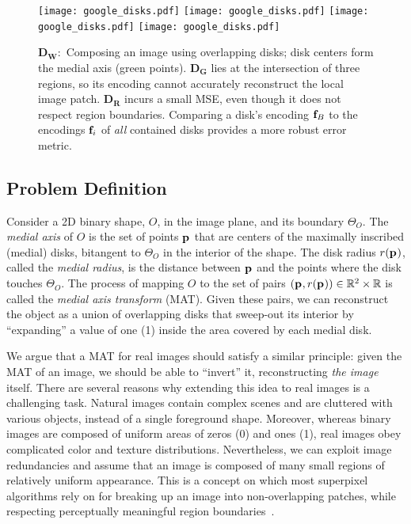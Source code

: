 \documentclass[10pt,twocolumn,letterpaper]{article}
\begin{document}
\begin{figure*}[t]
\centering
\def\imgw{0.245}
\texttt{[image: google\_disks.pdf]}
\texttt{[image: google\_disks.pdf]}
\texttt{[image: google\_disks.pdf]}
\texttt{[image: google\_disks.pdf]}
\caption{$\mathbf{D_W:}$ Composing an image using overlapping disks; disk centers form the medial axis (green points).
$\mathbf{D_G}$ lies at the intersection of three regions, so its encoding cannot accurately reconstruct the local image patch.
$\mathbf{D_R}$ incurs a small MSE, even though it does not respect region boundaries.
Comparing a disk's encoding $\mathbf{f}_{B}$ to the encodings $\mathbf{f}_{i}$ of \emph{all} contained disks provides a more robust
error metric.}
\label{fig:google}
\end{figure*}

\subsection{Problem Definition}\label{sec:method:definition}
Consider a 2D binary shape, $O$, in the image plane, and its boundary $\Theta_O$.
The \emph{medial axis} of $O$ is the set of points $\mathbf{p}_{}$ that
are centers of the maximally inscribed (medial) disks, bitangent to $\Theta_O$
in the interior of the shape. The disk radius $r(\mathbf{p}_{})$, called the \emph{medial radius}, 
is the distance between $\mathbf{p}_{}$ and the points where the disk touches $\Theta_O$.
The process of mapping $O$ to the set of pairs $(\mathbf{p}_{},r(\mathbf{p}_{})) \in \mathbb{R}^2 \times \mathbb{R}$
is called the \emph{medial axis transform} (MAT).
Given these pairs, we can reconstruct the object as a union of overlapping disks that sweep-out 
its interior by ``expanding'' a value of one (1) inside the area covered by each  medial disk.

We argue that a MAT for real images should satisfy a similar principle: given the MAT of an image, 
we should be able to ``invert'' it, reconstructing \emph{the image} itself.
There are several reasons why extending this idea to real images is a challenging task. 
Natural images contain complex scenes and are cluttered with various objects, instead of a single foreground shape.
Moreover, whereas binary images are composed of uniform areas of zeros (0) and ones (1), 
real images obey complicated color and texture distributions.
Nevertheless, we can exploit image redundancies and assume that an image is composed of many small regions of 
relatively uniform appearance.
This is a concept on which most superpixel algorithms rely on for breaking up an image 
into non-overlapping patches, while respecting perceptually meaningful region 
boundaries~\cite{shi2000normalized,levinshtein2009turbopixels,achanta2012slic}. 
\end{document}
